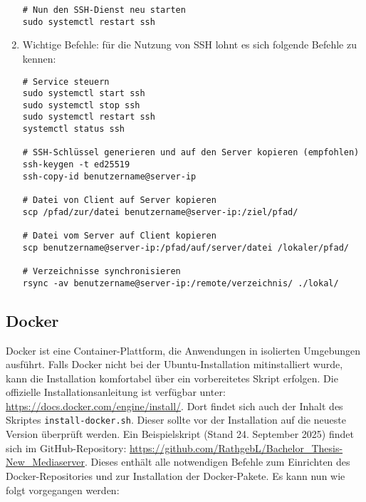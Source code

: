 \documentclass[12pt,a4paper]{report}
\begin{document}
\begin{enumerate}
\begin{verbatim}
# Nun den SSH-Dienst neu starten
sudo systemctl restart ssh
    \end{verbatim}

    \item Wichtige Befehle:
    für die Nutzung von SSH lohnt es sich folgende Befehle zu kennen:   
    \begin{verbatim}
# Service steuern
sudo systemctl start ssh
sudo systemctl stop ssh
sudo systemctl restart ssh
systemctl status ssh

# SSH-Schlüssel generieren und auf den Server kopieren (empfohlen)
ssh-keygen -t ed25519
ssh-copy-id benutzername@server-ip

# Datei von Client auf Server kopieren
scp /pfad/zur/datei benutzername@server-ip:/ziel/pfad/

# Datei vom Server auf Client kopieren
scp benutzername@server-ip:/pfad/auf/server/datei /lokaler/pfad/

# Verzeichnisse synchronisieren
rsync -av benutzername@server-ip:/remote/verzeichnis/ ./lokal/
    \end{verbatim}  
  \end{enumerate}


  \subsection{Docker}  
  Docker ist eine Container-Plattform, die Anwendungen in isolierten Umgebungen ausführt. 
  Falls Docker nicht bei der Ubuntu-Installation mitinstalliert wurde, kann die Installation komfortabel über ein vorbereitetes Skript erfolgen. 
  Die offizielle Installationsanleitung ist verfügbar unter: \url{https://docs.docker.com/engine/install/}.  
  Dort findet sich auch der Inhalt des Skriptes \texttt{install-docker.sh}. Dieser sollte vor der Installation auf die neueste Version überprüft werden. 
  Ein Beispielskript (Stand 24. September 2025) findet sich im GitHub-Repository: \url{https://github.com/RathgebL/Bachelor_Thesis-New_Mediaserver}.
  Dieses enthält alle notwendigen Befehle zum Einrichten des Docker-Repositories und zur Installation der Docker-Pakete.
  Es kann nun wie folgt vorgegangen werden: 
\end{document}
